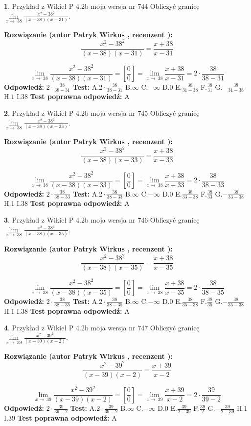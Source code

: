 \documentclass[12pt, a4paper]{article}
\theoremstyle{definition} %
\newtheorem{zad}{}
\newcommand{\zadStart}[1]{\begin{zad}#1\newline}
\newcommand{\zadStop}{\end{zad}}
\newcommand{\rozwStart}[2]{\noindent \textbf{Rozwiązanie (autor #1 , recenzent #2): }\newline}
\newcommand{\rozwStop}{\newline}
\newcommand{\odpStart}{\noindent \textbf{Odpowiedź:}\newline}
\newcommand{\odpStop}{\newline}
\newcommand{\testStart}{\noindent \textbf{Test:}\newline}
\newcommand{\testStop}{\newline}
\newcommand{\kluczStart}{\noindent \textbf{Test poprawna odpowiedź:}\newline}
\newcommand{\kluczStop}{\newline}
\begin{document}
\zadStart{Przykład z Wikieł P 4.2b moja wersja nr 744}
Obliczyć granicę $\lim\limits_{x\to\ 38}\frac{x^{2}-38^{2}}{(x-38)(x-31)}$.
\zadStop
\rozwStart{Patryk Wirkus}{}
$$\frac{x^{2}-38^{2}}{(x-38)(x-31)}=\frac{x+38}{x-31}$$

$$\lim\limits_{x\to\ 38}\frac{x^{2}-38^{2}}{(x-38)(x-31)}=[\frac{0}{0}]=\lim\limits_{x\to\ 38}\frac{x+38}{x-31}=2 \cdot \frac{38}{38-31}$$
\rozwStop
\odpStart
$2 \cdot \frac{38}{38-31}$
\odpStop
\testStart
A.$2 \cdot \frac{38}{38-31}$
B.$\infty$
C.$-\infty$
D.$0$
E.$\frac{38}{31-38}$
F.$\frac{38}{31}$
G.$-\frac{38}{31-38}$
H.$1$
I.$38$
\testStop
\kluczStart
A
\kluczStop



\zadStart{Przykład z Wikieł P 4.2b moja wersja nr 745}
Obliczyć granicę $\lim\limits_{x\to\ 38}\frac{x^{2}-38^{2}}{(x-38)(x-33)}$.
\zadStop
\rozwStart{Patryk Wirkus}{}
$$\frac{x^{2}-38^{2}}{(x-38)(x-33)}=\frac{x+38}{x-33}$$

$$\lim\limits_{x\to\ 38}\frac{x^{2}-38^{2}}{(x-38)(x-33)}=[\frac{0}{0}]=\lim\limits_{x\to\ 38}\frac{x+38}{x-33}=2 \cdot \frac{38}{38-33}$$
\rozwStop
\odpStart
$2 \cdot \frac{38}{38-33}$
\odpStop
\testStart
A.$2 \cdot \frac{38}{38-33}$
B.$\infty$
C.$-\infty$
D.$0$
E.$\frac{38}{33-38}$
F.$\frac{38}{33}$
G.$-\frac{38}{33-38}$
H.$1$
I.$38$
\testStop
\kluczStart
A
\kluczStop



\zadStart{Przykład z Wikieł P 4.2b moja wersja nr 746}
Obliczyć granicę $\lim\limits_{x\to\ 38}\frac{x^{2}-38^{2}}{(x-38)(x-35)}$.
\zadStop
\rozwStart{Patryk Wirkus}{}
$$\frac{x^{2}-38^{2}}{(x-38)(x-35)}=\frac{x+38}{x-35}$$

$$\lim\limits_{x\to\ 38}\frac{x^{2}-38^{2}}{(x-38)(x-35)}=[\frac{0}{0}]=\lim\limits_{x\to\ 38}\frac{x+38}{x-35}=2 \cdot \frac{38}{38-35}$$
\rozwStop
\odpStart
$2 \cdot \frac{38}{38-35}$
\odpStop
\testStart
A.$2 \cdot \frac{38}{38-35}$
B.$\infty$
C.$-\infty$
D.$0$
E.$\frac{38}{35-38}$
F.$\frac{38}{35}$
G.$-\frac{38}{35-38}$
H.$1$
I.$38$
\testStop
\kluczStart
A
\kluczStop



\zadStart{Przykład z Wikieł P 4.2b moja wersja nr 747}
Obliczyć granicę $\lim\limits_{x\to\ 39}\frac{x^{2}-39^{2}}{(x-39)(x-2)}$.
\zadStop
\rozwStart{Patryk Wirkus}{}
$$\frac{x^{2}-39^{2}}{(x-39)(x-2)}=\frac{x+39}{x-2}$$

$$\lim\limits_{x\to\ 39}\frac{x^{2}-39^{2}}{(x-39)(x-2)}=[\frac{0}{0}]=\lim\limits_{x\to\ 39}\frac{x+39}{x-2}=2 \cdot \frac{39}{39-2}$$
\rozwStop
\odpStart
$2 \cdot \frac{39}{39-2}$
\odpStop
\testStart
A.$2 \cdot \frac{39}{39-2}$
B.$\infty$
C.$-\infty$
D.$0$
E.$\frac{39}{2-39}$
F.$\frac{39}{2}$
G.$-\frac{39}{2-39}$
H.$1$
I.$39$
\testStop
\kluczStart
A
\kluczStop
\end{document}
